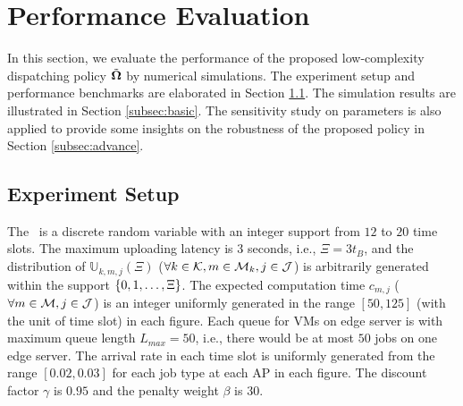 \section{Performance Evaluation}
\label{sec:evaluation}
In this section, we evaluate the performance of the proposed low-complexity dispatching policy $\tilde{\boldsymbol{\Omega}}$ by numerical simulations.
The experiment setup and performance benchmarks are elaborated in Section \ref{subsec:setup}.
The simulation results are illustrated in Section \ref{subsec:basic}.
The sensitivity study on parameters is also applied to provide some insights on the robustness of the proposed policy in Section \ref{subsec:advance}.

\subsection{Experiment Setup}
\label{subsec:setup}

The \brlatency~is a discrete random variable with an integer support from $12$ to $20$ time slots.
The maximum uploading latency is $3$ seconds, i.e., $\Xi = 3t_B$, and the distribution of $\mathbb{U}_{k,m,j}(\Xi)$ ($\forall k\in\mathcal{K}, m\in\mathcal{M}_{k}, j\in\mathcal{J}$) is arbitrarily generated within the support $\{0, 1, \dots, \Xi\}$.
The expected computation time $c_{m,j}$ ($\forall m\in\mathcal{M}, j\in\mathcal{J}$) is an integer uniformly generated in the range $[50,125]$ (with the unit of time slot) in each figure.
Each queue for VMs on edge server is with maximum queue length $L_{max}=50$, i.e., there would be at most $50$ jobs on one edge server.
The arrival rate in each time slot is uniformly generated from the range $[0.02, 0.03]$ for each job type at each AP in each figure.
The discount factor $\gamma$ is $0.95$ and the penalty weight $\beta$ is $30$.

